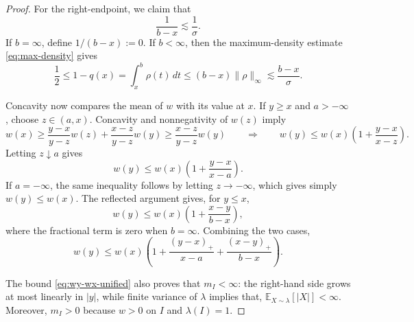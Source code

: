 \documentclass[11pt]{article}
\theoremstyle{definition}
\theoremstyle{remark}
\newcommand{\E}{\mathbb E}
\begin{document}
\begin{proof}
For the right-endpoint, we claim that 
\begin{equation}\label{eq:right-endpoint}
 \frac1{b-x}\lesssim\frac1\sigma.
\end{equation}
If $b=\infty$, define $1/(b-x):=0$.  If $b<\infty$, then the
maximum-density estimate \eqref{eq:max-density} gives
\[
 \frac12\le1-q(x)=\int_x^b\rho(t)\,dt
 \le(b-x)\|\rho\|_\infty
 \lesssim\frac{b-x}{\sigma}.
\]


Concavity now compares the mean of $w$ with its value at $x$.  If $y\ge x$ and
$a> -\infty$, choose $z\in(a,x)$. 
Concavity and nonnegativity of $w(z)$ imply
\[
 w(x)
 \ge
 \frac{y-x}{y-z}w(z)+\frac{x-z}{y-z}w(y)
 \ge
 \frac{x-z}{y-z}w(y)\qquad \Longrightarrow\qquad w(y)\leq w(x)\left(1+\frac{y-x}{x-z}\right).
\]
Letting $z\downarrow a$ gives
\[
 w(y)\le w(x)\left(1+\frac{y-x}{x-a}\right).
\]
If $a=-\infty$, the same inequality follows by letting $z\to-\infty$, which gives simply $w(y)\le w(x)$.
The reflected argument gives, for $y\le x$,
\[
 w(y)\le w(x)\left(1+\frac{x-y}{b-x}\right),
\]
where the fractional term is zero when $b=\infty$.  Combining the two
cases,
\begin{equation}\label{eq:wy-wx-unified}
 w(y)
 \le
 w(x)\left(
 1+\frac{(y-x)_+}{x-a}+\frac{(x-y)_+}{b-x}
 \right).
\end{equation}

The bound \eqref{eq:wy-wx-unified} also proves that
$m_I<\infty$: the right-hand side grows at most
linearly in $|y|$, while finite variance of $\lambda$ implies that, $\E_{X\sim \lambda}[|X|]<\infty$.
Moreover, $m_I>0$ because $w>0$ on $I$ and $\lambda(I)=1$.


\end{proof}
\end{document}
